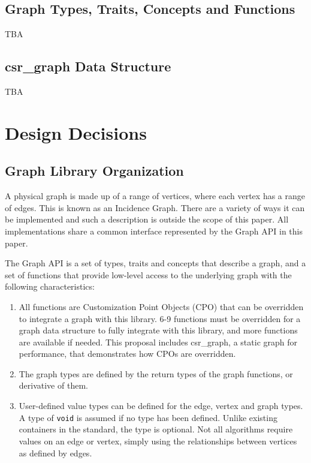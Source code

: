 \documentclass[10pt,onecolumn]{article}
\begin{document}
\subsection{Graph Types, Traits, Concepts and Functions}
TBA

\subsection{csr\_graph Data Structure}
TBA

\section{Design Decisions}
\subsection{Graph Library Organization}
A physical graph is made up of a range of vertices, where each vertex has a range of edges. This is known as an Incidence Graph. There are a variety of 
ways it can be implemented and such a description is outside the scope of this paper. All implementations share a common interface represented by the
Graph API in this paper.

The Graph API is a set of types, traits and concepts that describe a graph, and a set of functions that provide low-level access to the 
underlying graph with the following characteristics:
\begin{enumerate}
\item All functions are Customization Point Objects (CPO) that can be overridden to integrate a graph with this library. 
6-9 functions must be overridden for a graph data structure to fully integrate with this library, and more functions are available if needed. This proposal includes 
csr\_graph, a static graph for performance, that demonstrates how CPOs are overridden.
\item The graph types are defined by the return types of the graph functions, or derivative of them.
\item User-defined value types can be defined for the edge, vertex and graph types. A type of \texttt{void} is assumed if no type has been defined.
Unlike existing containers in the standard, the type is optional. Not all algorithms require values on an edge or vertex, simply using the relationships
between vertices as defined by edges.
\end{enumerate}
\end{document}

